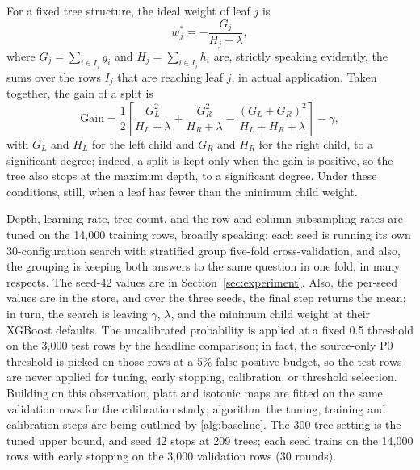 \documentclass[a4paper,fleqn]{cas-sc}
\begin{document}
For a fixed tree structure, the ideal weight of leaf $j$ is
\begin{equation}
  w_j^{*} = -\frac{G_j}{H_j + \lambda},
\end{equation}
where $G_j = \sum_{i \in I_j} g_i$ and $H_j = \sum_{i \in I_j} h_i$ are, strictly speaking evidently, the sums over the rows $I_j$ that are reaching leaf $j$, in actual application. Taken together, the gain of a split is
\begin{equation}
  \mathrm{Gain} = \frac{1}{2}\left[ \frac{G_L^2}{H_L+\lambda} + \frac{G_R^2}{H_R+\lambda} - \frac{(G_L+G_R)^2}{H_L+H_R+\lambda} \right] - \gamma,
\end{equation}
with $G_L$ and $H_L$ for the left child and $G_R$ and $H_R$ for the right child, to a significant degree; indeed, a split is kept only when the gain is positive, so the tree also stops at the maximum depth, to a significant degree. Under these conditions, still, when a leaf has fewer than the minimum child weight.

Depth, learning rate, tree count, and the row and column subsampling rates are tuned on the 14{,}000 training rows, broadly speaking; each seed is running its own 30-configuration search with stratified group five-fold cross-validation, and also, the grouping is keeping both answers to the same question in one fold, in many respects. The seed-42 values are in Section~\ref{sec:experiment}. Also, the per-seed values are in the store, and over the three seeds, the final step returns the mean; in turn, the search is leaving $\gamma$, $\lambda$, and the minimum child weight at their XGBoost defaults. The uncalibrated probability is applied at a fixed 0.5 threshold on the 3{,}000 test rows by the headline comparison; in fact, the source-only P0 threshold is picked on those rows at a 5\% false-positive budget, so the test rows are never applied for tuning, early stopping, calibration, or threshold selection. Building on this observation, platt and isotonic maps are fitted on the same validation rows for the calibration study; algorithm~the tuning, training and calibration steps are being outlined by \ref{alg:baseline}. The 300-tree setting is the tuned upper bound, and seed 42 stops at 209 trees; each seed trains on the 14{,}000 rows with early stopping on the 3{,}000 validation rows (30 rounds).
\end{document}
